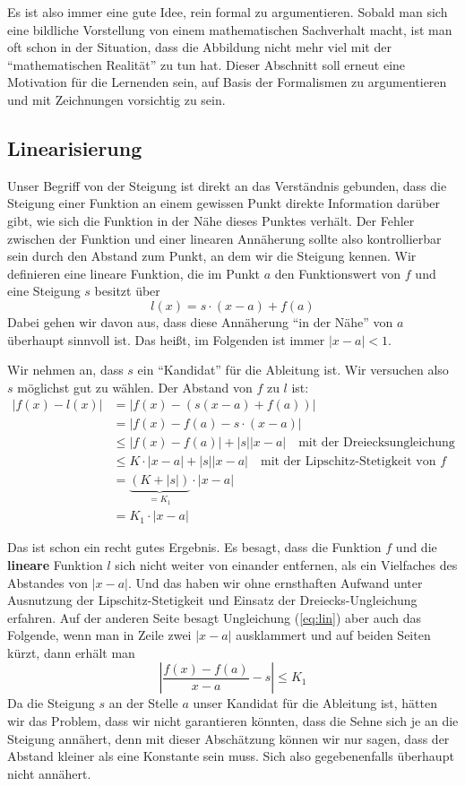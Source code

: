 Es ist also immer eine gute Idee, rein formal zu argumentieren. Sobald man sich eine bildliche Vorstellung von einem mathematischen Sachverhalt macht, ist man oft schon in der Situation, dass die Abbildung nicht mehr viel mit der "`mathematischen Realität"' zu tun hat. Dieser Abschnitt soll erneut eine Motivation für die Lernenden sein, auf Basis der Formalismen zu argumentieren und mit Zeichnungen vorsichtig zu sein.

\subsection{Linearisierung}

Unser Begriff von der Steigung ist direkt an das Verständnis gebunden, dass die Steigung einer Funktion an einem gewissen Punkt direkte Information darüber gibt, wie sich die Funktion in der Nähe dieses Punktes verhält. Der Fehler zwischen der Funktion und einer linearen Annäherung sollte also kontrollierbar sein durch den Abstand zum Punkt, an dem wir die Steigung kennen. Wir definieren eine lineare Funktion, die im Punkt $a$ den Funktionswert von $f$  und eine Steigung $s$ besitzt über
\[
l(x) = s\cdot (x-a)+f(a)
\]
Dabei gehen wir davon aus, dass diese Annäherung "`in der Nähe"' von $a$ überhaupt sinnvoll ist. Das heißt, im Folgenden ist immer $|x-a|<1$.

Wir nehmen an, dass $s$ ein "`Kandidat"' für die Ableitung ist. Wir versuchen also $s$ möglichst gut zu wählen. 
Der Abstand von $f$ zu $l$ ist:
\begin{equation}\label{eq:lin}
\begin{split}
|f(x)-l(x)| &= |f(x)-(s(x-a)+f(a))| \\
&= |f(x)-f(a) -s\cdot (x-a)| \\
&\le |f(x)-f(a)| + |s||x-a| \quad \text{mit der Dreiecksungleichung} \\
&\le K\cdot |x-a| + |s||x-a| \quad \text{mit der Lipschitz-Stetigkeit von }f \\
&= \underbrace{(K+|s|)}_{=K_1}\cdot |x-a| \\
&= K_1\cdot |x-a|
\end{split}
\end{equation}

Das ist schon ein recht gutes Ergebnis. Es besagt, dass die Funktion $f$ und die \textbf{lineare} Funktion $l$ sich nicht weiter von einander entfernen, als ein Vielfaches des Abstandes von $|x-a|$. Und das haben wir ohne ernsthaften Aufwand unter Ausnutzung der Lipschitz-Stetigkeit und Einsatz der Dreiecks-Ungleichung erfahren. Auf der anderen Seite besagt Ungleichung (\ref{eq:lin}) aber auch das Folgende, wenn man in Zeile zwei $|x-a|$ ausklammert und auf beiden Seiten kürzt, dann erhält man
\begin{equation}\label{eq:const}
\left| \frac{f(x)-f(a)}{x-a} -s \right| \le K_1
\end{equation}
Da die Steigung $s$ an der Stelle $a$ unser Kandidat für die Ableitung ist, hätten wir das Problem, dass wir nicht garantieren könnten, dass die Sehne sich je an die Steigung annähert, denn mit dieser Abschätzung können wir nur sagen, dass der Abstand kleiner als eine Konstante sein muss. Sich also gegebenenfalls überhaupt nicht annähert.


